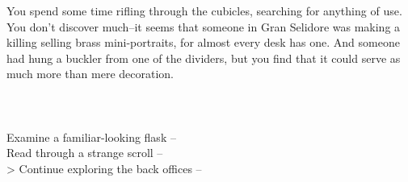 You spend some time rifling through the cubicles, searching for anything of use. You don’t discover much--it seems that someone in Gran Selidore was making a killing selling brass mini-portraits, for almost every desk has one. And someone had hung a buckler from one of the dividers, but you find that it could serve as much more than mere decoration.\\
\\
\\
\\

 Examine a familiar-looking flask -- \\
 Read through a strange scroll -- \\
> Continue exploring the back offices -- 